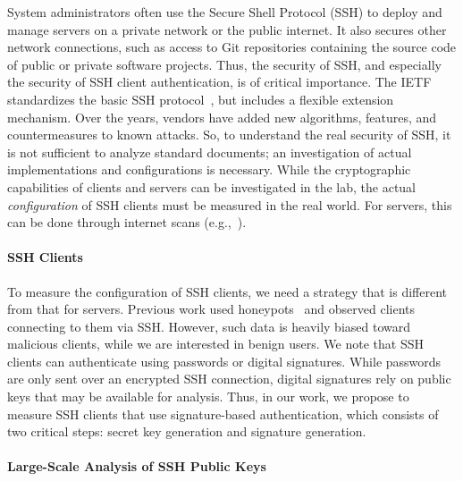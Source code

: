 \label{sec:introduction}

System administrators often use the Secure Shell Protocol (SSH) to deploy and manage servers on a private network or the public internet. It also secures other network connections, such as access to Git repositories containing the source code of public or private software projects. Thus, the security of SSH, and especially the security of SSH client authentication, is of critical importance. The IETF standardizes the basic SSH protocol~\cite{rfc4250,rfc4251,rfc4252,rfc4253,rfc4254}, but includes a flexible extension mechanism. Over the years, vendors have added new algorithms, features, and countermeasures to known attacks. So, to understand the real security of SSH, it is not sufficient to analyze standard documents; an investigation of actual implementations and configurations is necessary. While the cryptographic capabilities of clients and servers can be investigated in the lab, the actual \emph{configuration} of SSH clients must be measured in the real world. For servers, this can be done through internet scans (e.g.,~\cite{provos2001scanssh,6838249,USENIX:IzhTeiDur21}).

\paragraph{SSH Clients}

To measure the configuration of SSH clients, we need a strategy that is different from that for servers. Previous work used honeypots~\cite{6624967,melese2016honeypot,Wu2020MiningTI} and observed clients connecting to them via SSH. However, such data is heavily biased toward malicious clients, while we are interested in benign users. We note that SSH clients can authenticate using passwords or digital signatures. While passwords are only sent over an encrypted SSH connection, digital signatures rely on public keys that may be available for analysis. Thus, in our work, we propose to measure SSH clients that use signature-based authentication, which consists of two critical steps: secret key generation and signature generation.

\paragraph{Large-Scale Analysis of SSH Public Keys}

